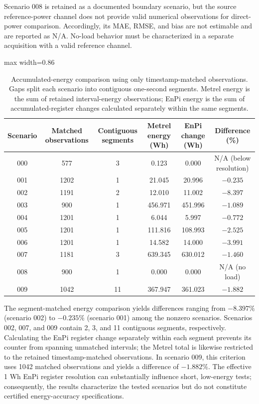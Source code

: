\documentclass[technologies,article,submit,pdftex,moreauthors]{Definitions/mdpi}
\begin{document}
Scenario 008 is retained as a documented boundary scenario, but the source reference-power channel does not provide valid numerical observations for direct-power comparison. Accordingly, its MAE, RMSE, and bias are not estimable and are reported as N/A. No-load behavior must be characterized in a separate acquisition with a valid reference channel.

\begin{table}[!htbp]
\caption{Accumulated-energy comparison using only timestamp-matched observations. Gaps split each scenario into contiguous one-second segments. Metrel energy is the sum of retained interval-energy observations; EnPi energy is the sum of accumulated-register changes calculated separately within the same segments.}
\label{tab:energy-direct-main}
\centering
\scriptsize
\setlength{\tabcolsep}{4pt}
\begin{adjustbox}{max width=0.86\textwidth}
\begin{tabular}{cccccc}
\toprule
Scenario & Matched observations & Contiguous segments & Metrel energy (Wh) & EnPi change (Wh) & Difference (\%) \\
\midrule
000 & 577 & 3 & 0.123 & 0.000 & N/A (below resolution) \\
001 & 1202 & 1 & 21.045 & 20.996 & $-0.235$ \\
002 & 1191 & 2 & 12.010 & 11.002 & $-8.397$ \\
003 & 900 & 1 & 456.971 & 451.996 & $-1.089$ \\
004 & 1201 & 1 & 6.044 & 5.997 & $-0.772$ \\
005 & 1201 & 1 & 111.816 & 108.993 & $-2.525$ \\
006 & 1201 & 1 & 14.582 & 14.000 & $-3.991$ \\
007 & 1181 & 3 & 639.345 & 630.012 & $-1.460$ \\
008 & 900 & 1 & 0.000 & 0.000 & N/A (no load) \\
009 & 1042 & 11 & 367.947 & 361.023 & $-1.882$ \\
\bottomrule
\end{tabular}
\end{adjustbox}
\end{table}

The segment-matched energy comparison yields differences ranging from $-8.397\%$ (scenario 002) to $-0.235\%$ (scenario 001) among the nonzero scenarios. Scenarios 002, 007, and 009 contain 2, 3, and 11 contiguous segments, respectively. Calculating the EnPi register change separately within each segment prevents its counter from spanning unmatched intervals; the Metrel total is likewise restricted to the retained timestamp-matched observations. In scenario 009, this criterion uses 1042 matched observations and yields a difference of $-1.882\%$. The effective 1 Wh EnPi register resolution can substantially influence short, low-energy tests; consequently, the results characterize the tested scenarios but do not constitute certified energy-accuracy specifications.
\end{document}
